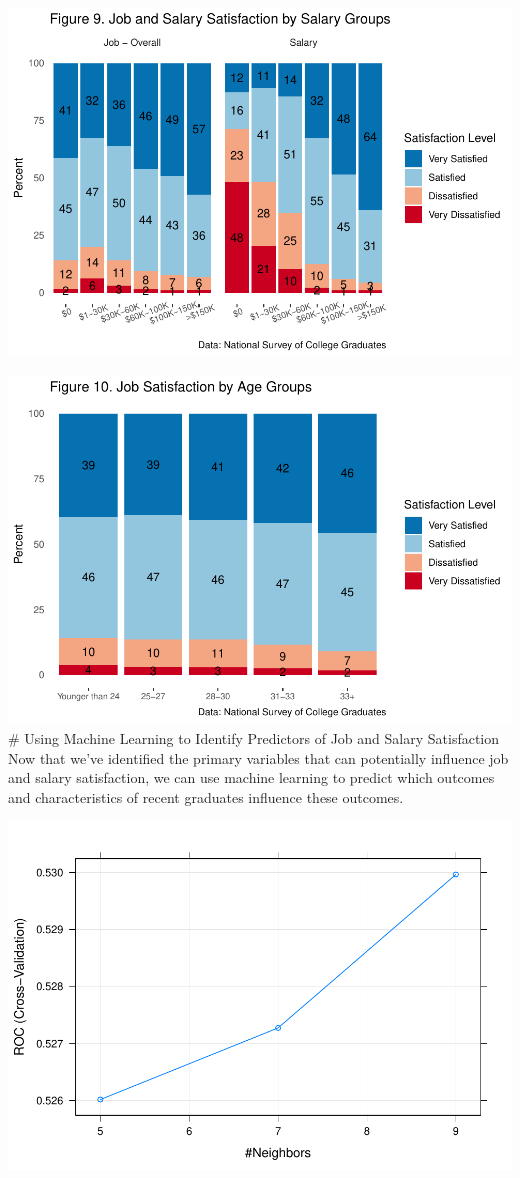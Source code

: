 \documentclass[]{article}
\begin{document}
\includegraphics{Report_Draft_04282019_files/figure-latex/unnamed-chunk-10-1.pdf}

\includegraphics{Report_Draft_04282019_files/figure-latex/unnamed-chunk-11-1.pdf}
\# Using Machine Learning to Identify Predictors of Job and Salary
Satisfaction Now that we've identified the primary variables that can
potentially influence job and salary satisfaction, we can use machine
learning to predict which outcomes and characteristics of recent
graduates influence these outcomes.

\includegraphics{Report_Draft_04282019_files/figure-latex/unnamed-chunk-18-1.pdf}
\end{document}
